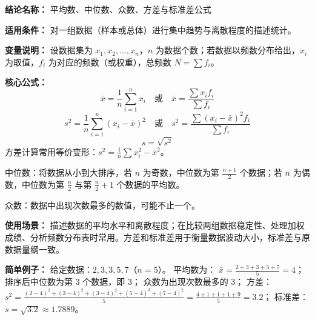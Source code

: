 \textbf{结论名称：} 平均数、中位数、众数、方差与标准差公式

\textbf{适用条件：} 对一组数据（样本或总体）进行集中趋势与离散程度的描述统计。

\textbf{变量说明：}
设数据集为 \(x_1, x_2, \dots, x_n\)，\(n\) 为数据个数；若数据以频数分布给出，\(x_i\) 为取值，\(f_i\) 为对应的频数（或权重），总频数 \(N = \sum f_i\)。

\textbf{核心公式：}
\[
\boxed{
\bar{x} = \frac{1}{n}\sum_{i=1}^{n} x_i 
\quad\text{或}\quad 
\bar{x} = \frac{\sum x_i f_i}{\sum f_i}
}
\]
\[
\boxed{
s^2 = \frac{1}{n}\sum_{i=1}^{n} (x_i - \bar{x})^2 
\quad\text{或}\quad 
s^2 = \frac{\sum (x_i - \bar{x})^2 f_i}{\sum f_i}
}
\]
\[
\boxed{s = \sqrt{s^2}}
\]
方差计算常用等价变形：\(s^2 = \frac{1}{n}\sum x_i^2 - \bar{x}^2\)。

中位数：将数据从小到大排序，若 \(n\) 为奇数，中位数为第 \(\frac{n+1}{2}\) 个数据；若 \(n\) 为偶数，中位数为第 \(\frac{n}{2}\) 与第 \(\frac{n}{2}+1\) 个数据的平均数。

众数：数据中出现次数最多的数值，可能不止一个。

\textbf{使用场景：}
描述数据的平均水平和离散程度；在比较两组数据稳定性、处理加权成绩、分析频数分布表时常用。方差和标准差用于衡量数据波动大小，标准差与原数据量纲一致。

\textbf{简单例子：}
给定数据：\(2, 3, 3, 5, 7\)（\(n=5\)）。
平均数为：
\(\bar{x} = \frac{2+3+3+5+7}{5} = 4\)；
排序后中位数为第 \(3\) 个数据，即 \(3\)；
众数为出现次数最多的 \(3\)；
方差：
\(s^2 = \frac{(2-4)^2 + (3-4)^2 + (3-4)^2 + (5-4)^2 + (7-4)^2}{5} 
= \frac{4+1+1+1+9}{5} = 3.2\)；
标准差：\(s = \sqrt{3.2} \approx 1.7889\)。